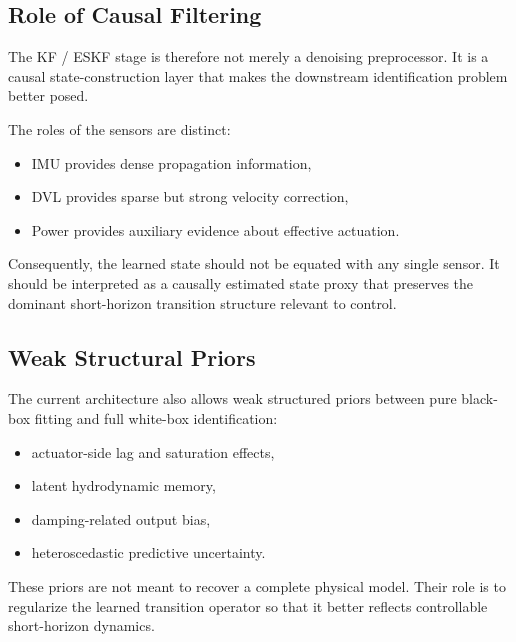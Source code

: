 \subsection{Role of Causal Filtering}

The KF / ESKF stage is therefore not merely a denoising preprocessor.
It is a causal state-construction layer that makes the downstream identification problem better posed.

The roles of the sensors are distinct:
\begin{itemize}
  \item IMU provides dense propagation information,
  \item DVL provides sparse but strong velocity correction,
  \item Power provides auxiliary evidence about effective actuation.
\end{itemize}

Consequently, the learned state should not be equated with any single sensor.
It should be interpreted as a causally estimated state proxy that preserves the dominant short-horizon transition structure relevant to control.

\subsection{Weak Structural Priors}

The current architecture also allows weak structured priors between pure black-box fitting and full white-box identification:
\begin{itemize}
  \item actuator-side lag and saturation effects,
  \item latent hydrodynamic memory,
  \item damping-related output bias,
  \item heteroscedastic predictive uncertainty.
\end{itemize}

These priors are not meant to recover a complete physical model.
Their role is to regularize the learned transition operator so that it better reflects controllable short-horizon dynamics.

